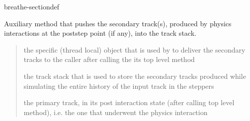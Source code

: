 \documentclass[letterpaper,10pt,english]{sphinxmanual}
\begin{document}
\begin{fulllineitems}
\begin{sphinxuseclass}{breathe-sectiondef}
\begin{fulllineitems}
\label{\detokenize{Simulation/SimulationCodeDoc:_CPPv4N12SteppingLoop16StackSecondariesER13G4HepEmTLDataR10TrackStackR12G4HepEmTrack}}
\pysigstartsignatures
\pysigstartmultiline
{}
\pysigstopmultiline
\pysigstopsignatures
\sphinxAtStartPar
Auxiliary method that pushes the secondary track(s), produced by physics interactions at the post\sphinxhyphen{}step point (if any), into the track stack. 

\sphinxAtStartPar
\begin{quote}\begin{description}
\sphinxAtStartPar
the  specific (thread local) object that is used by  to deliver the secondary tracks to the caller after calling the its  top level method 

\sphinxAtStartPar
the track stack that is used to store the secondary tracks produced while simulating the entire history of the input track in the steppers 

\sphinxAtStartPar
the primary track, in its post interaction state (after calling  top level  method), i.e. the one that underwent the physics interaction 

\end{description}\end{quote}


\end{fulllineitems}



\end{sphinxuseclass}
\end{fulllineitems}
\end{document}
